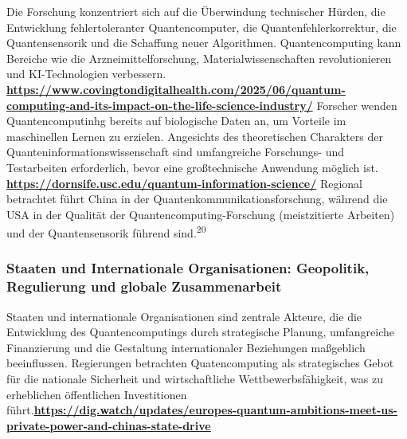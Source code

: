 Die Forschung konzentriert sich auf die Überwindung technischer Hürden, die Entwicklung fehlertoleranter Quantencomputer, die Quantenfehlerkorrektur, die Quantensensorik und die Schaffung neuer Algorithmen. Quantencomputing kann Bereiche wie die Arzneimittelforschung, Materialwissenschaften revolutionieren und KI-Technologien verbessern. \textbf{\href{https://www.covingtondigitalhealth.com/2025/06/quantum-computing-and-its-impact-on-the-life-science-industry/}{https://www.covingtondigitalhealth.com/2025/06/quantum-computing-and-its-impact-on-the-life-science-industry/}} Forscher wenden Quantencomputinhg bereits auf biologische Daten an, um Vorteile im maschinellen Lernen zu erzielen. Angesichts des theoretischen Charakters der Quanteninformationswissenschaft sind umfangreiche Forschungs- und Testarbeiten erforderlich, bevor eine großtechnische Anwendung möglich ist. \textbf{\href{https://dornsife.usc.edu/quantum-information-science/}{https://dornsife.usc.edu/quantum-information-science/}} Regional betrachtet führt China in der Quantenkommunikationsforschung, während die USA in der Qualität der Quantencomputing-Forschung (meistzitierte Arbeiten) und der Quantensensorik führend sind.\textsuperscript{20}

\subsubsection{Staaten und Internationale Organisationen: Geopolitik, Regulierung und globale Zusammenarbeit}
Staaten und internationale Organisationen sind zentrale Akteure, die die Entwicklung des Quantencomputings durch strategische Planung, umfangreiche Finanzierung und die Gestaltung internationaler Beziehungen maßgeblich beeinflussen. Regierungen betrachten Quatencomputing als strategisches Gebot für die nationale Sicherheit und wirtschaftliche Wettbewerbsfähigkeit, was zu erheblichen öffentlichen Investitionen führt.\textbf{\href{https://dig.watch/updates/europes-quantum-ambitions-meet-us-private-power-and-chinas-state-drive}{https://dig.watch/updates/europes-quantum-ambitions-meet-us-private-power-and-chinas-state-drive}}

